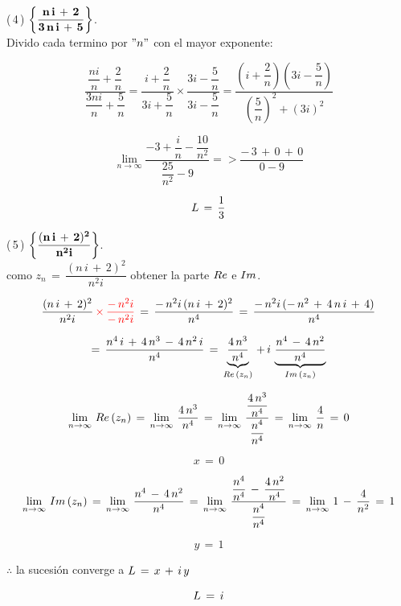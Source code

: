 \documentclass[a4paper,11pt,openany]{book}
\begin{document}
\textcolor{ao(english)}{(\,4\,)} $\bf{\left\{\dfrac{n\,i\,+\,2}{3\,n\,i\,+\,5}\right\}}$.\\

 Divido cada termino por $"n"$ con el mayor exponente:
 
 $$\dfrac{\dfrac{n i}{n}+\dfrac{2}{n}}{\dfrac{3n i}{n}+\dfrac{5}{n}} = \dfrac{i+\dfrac{2}{n}}{3i+\dfrac{5}{n}} \times \dfrac{3i-\dfrac{5}{n}}{3i-\dfrac{5}{n}} = \dfrac{\left(i+ \dfrac{2}{n} \right) \left(3i- \dfrac{5}{n} \right)}{ \left( \dfrac{5}{n} \right)^{2} + (3i)^{2} } $$
 
 $$\displaystyle\lim_{n \to \infty} \dfrac{-3+\dfrac{i}{n}-\dfrac{10}{n^{2}}}{\dfrac{25}{n^{2}}-9} => \dfrac{-\,3\,+\,0\,+\,0}{0 -9} $$
 
 $$\mathnormal{L}\,=\,\dfrac{1}{3}$$

\textcolor{ao(english)}{(\,5\,)} $\bf{\left\{\dfrac{(n\,i\,+\,2)^{2}}{n^{2}i}\right\}}$.\\

\textcolor{ao(english)}{} como $z_{n}\,=\,\dfrac{(n\,i\,+\,2)^{2}}{n^{2}i}$ obtener la parte $\mathnormal{Re}$ e $\mathnormal{Im}$.

$$\dfrac{(n\,i\,+\,2)^{2}}{n^{2}i}\,\textcolor{red}{\times\,\dfrac{-\,n^{2}i}{-\,n^{2}i}}\,=\,\dfrac{-\,n^{2}i\,(n\,i\,+\,2)^{2}}{n^{4}}\,=\,\dfrac{-\,n^{2}i\,(-\,n^{2}\,+\,4\,n\,i\,+\,4)}{n^{4}}$$

$$=\,\dfrac{n^{4}\,i\,+\,4\,n^{3}\,-\,4\,n^{2}\,i}{n^{4}}\,=\,\underbrace{\dfrac{4\,n^{3}}{n^{4}}}_{\mathnormal{Re}\,(z_{n})}\,+\,i\,\underbrace{\dfrac{n^{4}\,-\,4\,n^{2}}{n^{4}}}_{\mathnormal{Im}\,(z_{n})}$$

$$\displaystyle\lim_{n \to \infty}\,\mathnormal{Re}\,(z_{n})\,=\,\displaystyle\lim_{n \to \infty}\,\dfrac{4\,n^{3}}{n^{4}}\,=\,\displaystyle\lim_{n \to \infty}\,\dfrac{\dfrac{4\,n^{3}}{n^{4}}}{\dfrac{n^{4}}{n^{4}}}\,=\,\displaystyle\lim_{n \to \infty}\,\dfrac{4}{n}\,=\,0$$

$$x\,=\,0$$

$$\displaystyle\lim_{n \to \infty}\,\mathnormal{Im}\,(z_{n})\,=\,\displaystyle\lim_{n \to \infty}\,\dfrac{n^{4}\,-\,4\,n^{2}}{n^{4}}\,=\,\displaystyle\lim_{n \to \infty}\,\dfrac{\dfrac{n^{4}}{n^{4}}\,-\,\dfrac{4\,n^{2}}{n^{4}}}{\dfrac{n^{4}}{n^{4}}}\,=\,\displaystyle\lim_{n \to \infty}\,1\,-\,\dfrac{4}{n^{2}}\,=\,1$$

$$y\,=\,1$$

$\therefore$ la sucesión converge a $\mathnormal{L}\,=\,x\,+\,i\,y$

$$\mathnormal{L}\,=\,i$$
\end{document}
